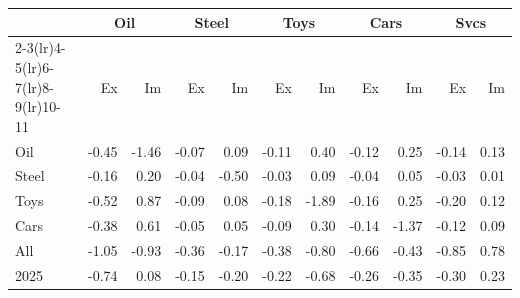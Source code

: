 \begin{tabular}{lrrrrrrrrrr}
\toprule
 & \multicolumn{2}{c}{Oil} & \multicolumn{2}{c}{Steel} & \multicolumn{2}{c}{Toys} & \multicolumn{2}{c}{Cars} & \multicolumn{2}{c}{Svcs} \\
\cmidrule(lr){2-3}\cmidrule(lr){4-5}\cmidrule(lr){6-7}\cmidrule(lr){8-9}\cmidrule(lr){10-11}
 & Ex & Im & Ex & Im & Ex & Im & Ex & Im & Ex & Im \\
\midrule
Oil & -0.45 & -1.46 & -0.07 & 0.09 & -0.11 & 0.40 & -0.12 & 0.25 & -0.14 & 0.13 \\
Steel & -0.16 & 0.20 & -0.04 & -0.50 & -0.03 & 0.09 & -0.04 & 0.05 & -0.03 & 0.01 \\
Toys & -0.52 & 0.87 & -0.09 & 0.08 & -0.18 & -1.89 & -0.16 & 0.25 & -0.20 & 0.12 \\
Cars & -0.38 & 0.61 & -0.05 & 0.05 & -0.09 & 0.30 & -0.14 & -1.37 & -0.12 & 0.09 \\
All & -1.05 & -0.93 & -0.36 & -0.17 & -0.38 & -0.80 & -0.66 & -0.43 & -0.85 & 0.78 \\
2025 & -0.74 & 0.08 & -0.15 & -0.20 & -0.22 & -0.68 & -0.26 & -0.35 & -0.30 & 0.23 \\
\bottomrule
\end{tabular}
